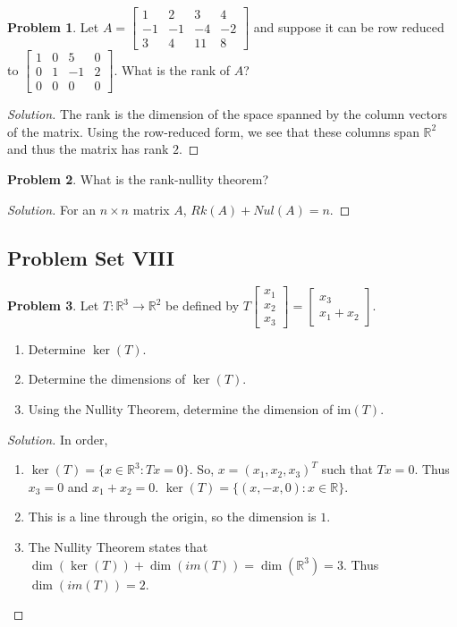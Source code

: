 \documentclass[oneside]{book}
\theoremstyle{definition}
\newtheorem{problem}{Problem}[section]
\begin{document}
\begin{problem}
Let $A=\begin{bmatrix} 1 & 2 & 3 & 4 \\ -1 & -1 & -4 & -2 \\ 3 & 4 & 11 & 8 \end{bmatrix}$ and suppose it can be row reduced to $\begin{bmatrix} 1 & 0 & 5 & 0 \\ 0 & 1 & -1 & 2 \\ 0 & 0 & 0 & 0 \end{bmatrix}$. What is the rank of $A$?
\end{problem}
\begin{proof}[Solution]
The rank is the dimension of the space spanned by the column vectors of the matrix. Using the row-reduced form, we see that these columns span $\mathbb{R}^2$ and thus the matrix has rank $2$.
\end{proof}

\begin{problem}
What is the rank-nullity theorem?
\end{problem}
\begin{proof}[Solution]
For an $n\times n$ matrix $A$, $Rk(A)+Nul(A) = n$.
\end{proof}

\subsection*{Problem Set VIII}

\begin{problem}
Let $T:\mathbb{R}^3\rightarrow \mathbb{R}^2$ be defined by $T\begin{bmatrix} x_1 \\ x_2 \\ x_3 \end{bmatrix} = \begin{bmatrix} x_3 \\ x_1+x_2 \end{bmatrix}$.
\begin{enumerate}
\item Determine $\ker(T)$.
\item Determine the dimensions of $\ker(T)$.
\item Using the Nullity Theorem, determine the dimension of im$(T)$.
\end{enumerate}
\end{problem}
\begin{proof}[Solution]
In order,
\begin{enumerate}
\item $\ker(T)= \{x\in \mathbb{R}^3: Tx = 0\}$. So, $x = (x_1,x_2,x_3)^T$ such that $Tx = 0$. Thus $x_3 = 0$ and $x_1+x_2 = 0$. $\ker(T) = \{(x,-x,0):x\in \mathbb{R}\}$.
\item This is a line through the origin, so the dimension is $1$. 
\item The Nullity Theorem states that $\dim(\ker(T))+\dim(im(T)) = \dim(\mathbb{R}^3) = 3$. Thus $\dim(im(T)) = 2$.
\end{enumerate}
\end{proof}
\end{document}

